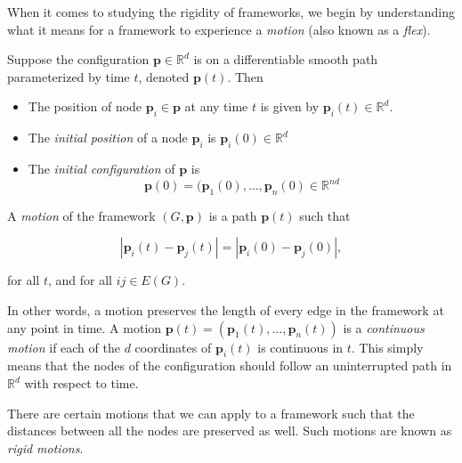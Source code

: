 \begin{flushleft}
When it comes to studying the rigidity of frameworks, we begin by understanding what it means for a framework to experience a \textit{motion} (also known as a \textit{flex}). 
\end{flushleft}

\begin{definition}
Suppose the configuration $\mathbf{p} \in \mathbb{R}^d$ is on a differentiable smooth path parameterized by time $t$, denoted $\mathbf{p}(t)$. Then 

    \begin{itemize}
        \item The position of node $\mathbf{p}_i \in \mathbf{p}$ at any time $t$ is given by $\mathbf{p}_i(t) \in \mathbb{R}^d$.
        \vspace{-3mm}
        \item The \textit{initial position} of a node $\mathbf{p}_i$ is $\mathbf{p}_i(0) \in \mathbb{R}^d$
        \vspace{-3mm}
        \item The \textit{initial configuration} of $\mathbf{p}$ is 
        \[
        \mathbf{p}(0) = (\mathbf{p}_1(0), \hdots, \mathbf{p}_n(0) \in \mathbb{R}^{nd}
        \]
    \end{itemize}
\end{definition}

\begin{definition}
A \textit{motion} of the framework $(G,\mathbf{p})$ is a path $\mathbf{p}(t)$ such that 

\[
|\mathbf{p}_i(t) - \mathbf{p}_j(t)| = |\mathbf{p}_i(0) - \mathbf{p}_j(0)|,
\]

\noindent
for all $t$, and for all $ij \in E(G)$.
\end{definition}

\begin{flushleft}
In other words, a motion preserves the length of every edge in the framework at any point in time. A motion $\mathbf{p}(t) = (\mathbf{p}_1(t), \hdots, \mathbf{p}_n(t))$ is a \textit{continuous motion} if each of the $d$ coordinates of $\mathbf{p}_i(t)$ is continuous in $t$. This simply means that the nodes of the configuration should follow an uninterrupted path in $\mathbb{R}^d$ with respect to time. 
\end{flushleft}

\begin{flushleft}
There are certain motions that we can apply to a framework such that the distances between all the nodes are preserved as well. Such motions are known as \textit{rigid motions}.
\end{flushleft}


